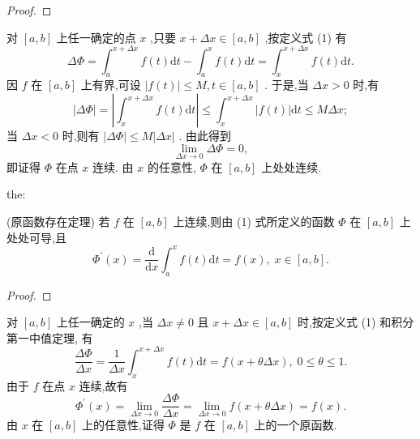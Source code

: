 \begin{proof}

\end{proof}
对 \(\left\lbrack  {a,b}\right\rbrack\) 上任一确定的点 \(x\) ,只要 \(x + {\Delta x} \in  \left\lbrack  {a,b}\right\rbrack\) ,按定义式 (1) 有
\[
{\Delta \Phi } = {\int }_{a}^{x + {\Delta x}}f\left( t\right) \mathrm{d}t - {\int }_{a}^{x}f\left( t\right) \mathrm{d}t = {\int }_{x}^{x + {\Delta x}}f\left( t\right) \mathrm{d}t.
\]
因 \(f\) 在 \(\left\lbrack  {a,b}\right\rbrack\) 上有界,可设 \(\left| {f\left( t\right) }\right|  \leq  M,t \in  \left\lbrack  {a,b}\right\rbrack\) . 于是,当 \({\Delta x} > 0\) 时,有
\[
\left| {\Delta \Phi }\right|  = \left| {{\int }_{x}^{x + {\Delta x}}f\left( t\right) \mathrm{d}t}\right|  \leq  {\int }_{x}^{x + {\Delta x}}\left| {f\left( t\right) }\right| \mathrm{d}t \leq  {M\Delta x};
\]
当 \({\Delta x} < 0\) 时,则有 \(\left| {\Delta \Phi }\right|  \leq  M\left| {\Delta x}\right|\) . 由此得到
\[
\mathop{\lim }\limits_{{{\Delta x} \rightarrow  0}}{\Delta \Phi } = 0,
\]
即证得 \(\Phi\) 在点 \(x\) 连续. 由 \(x\) 的任意性, \(\Phi\) 在 \(\left\lbrack  {a,b}\right\rbrack\) 上处处连续.

\begin{theorem}{}{the:}

\end{theorem}
 (原函数存在定理) 若 \(f\) 在 \(\left\lbrack  {a,b}\right\rbrack\) 上连续,则由 (1) 式所定义的函数 \(\Phi\) 在 \(\left\lbrack  {a,b}\right\rbrack\) 上处处可导,且
\[
{\Phi }^{\prime }\left( x\right)  = \frac{\mathrm{d}}{\mathrm{d}x}{\int }_{a}^{x}f\left( t\right) \mathrm{d}t = f\left( x\right) ,\;x \in  \left\lbrack  {a,b}\right\rbrack  . \tag{3}
\]
\begin{proof}

\end{proof}
对 \(\left\lbrack  {a,b}\right\rbrack\) 上任一确定的 \(x\) ,当 \({\Delta x} \neq  0\) 且 \(x + {\Delta x} \in  \left\lbrack  {a,b}\right\rbrack\) 时,按定义式 (1) 和积分第一中值定理, 有
\[
\frac{\Delta \Phi }{\Delta x} = \frac{1}{\Delta x}{\int }_{x}^{x + {\Delta x}}f\left( t\right) \mathrm{d}t = f\left( {x + {\theta \Delta x}}\right) ,\;0 \leq  \theta  \leq  1.
\]
由于 \(f\) 在点 \(x\) 连续,故有
\[
{\Phi }^{\prime }\left( x\right)  = \mathop{\lim }\limits_{{{\Delta x} \rightarrow  0}}\frac{\Delta \Phi }{\Delta x} = \mathop{\lim }\limits_{{{\Delta x} \rightarrow  0}}f\left( {x + {\theta \Delta x}}\right)  = f\left( x\right) .
\]
由 \(x\) 在 \(\left\lbrack  {a,b}\right\rbrack\) 上的任意性,证得 \(\Phi\) 是 \(f\) 在 \(\left\lbrack  {a,b}\right\rbrack\) 上的一个原函数.

